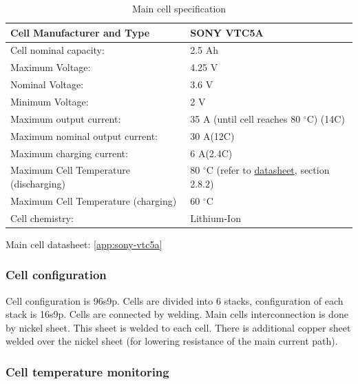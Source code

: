 \begin{table}[H]
	\centering
	\caption{Main cell specification}
	\begin{tabu}{|X|X|}
		\hline
		Cell Manufacturer and Type & SONY VTC5A \\
		\hline
		Cell nominal capacity: & 2.5 Ah \\
		\hline
		Maximum Voltage: & 4.25 V \\
		\hline
		Nominal Voltage: & 3.6 V \\
		\hline
		Minimum Voltage:  & 2 V \\
		\hline
		Maximum output current: & 35 A (until cell reaches 80 $^\circ$C) (14C)\\
		\hline
		Maximum nominal output current: & 30 A(12C) \\
		\hline
		Maximum charging current: & 6 A(2.4C) \\
		\hline
		Maximum Cell Temperature (discharging) & 80 $^\circ$C (refer to \hyperref[app:sony-vtc5a]{datasheet}, section 2.8.2) \\
		\hline
		Maximum Cell Temperature (charging) & 60 $^\circ$C \\
		\hline
		Cell chemistry: & Lithium-Ion \\
		\hline
	\end{tabu}%
	\label{tab:acc-cell}%
\end{table}%

Main cell datasheet: \ref{app:sony-vtc5a}

\subsubsection{Cell configuration}

Cell configuration is 96s9p. Cells are divided into 6 stacks, configuration of each stack is 16s9p. Cells are connected by welding. Main cells interconnection is done by nickel sheet. This sheet is welded to each cell. There is additional copper sheet welded over the nickel sheet (for lowering resistance of the main current path).

 
\subsubsection{Cell temperature monitoring}

